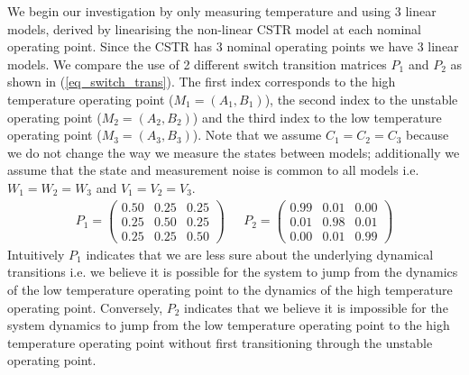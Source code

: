 We begin our investigation by only measuring temperature and using 3 linear models, derived by linearising the non-linear CSTR model at each nominal operating point. Since the CSTR has 3 nominal operating points we have 3 linear models. We compare the use of 2 different switch transition matrices $P_1$ and $P_2$ as shown in (\ref{eq_switch_trans}). The first index corresponds to the high temperature operating point ($M_1=(A_1, B_1)$), the second index to the unstable operating point ($M_2=(A_2, B_2)$) and the third index to the low temperature operating point ($M_3=(A_3, B_3)$). Note that we assume $C_1=C_2=C_3$ because we do not change the way we measure the states between models; additionally we assume that the state and measurement noise is common to all models i.e. $W_1=W_2=W_3$ and $V_1=V_2=V_3$.
\begin{equation}
\begin{aligned}
P_1 = \begin{pmatrix}
0.50 & 0.25 & 0.25 \\
0.25 & 0.50 & 0.25 \\
0.25 & 0.25 & 0.50
\end{pmatrix} 
~~~&P_2 = \begin{pmatrix}
0.99 & 0.01 & 0.00 \\
0.01 & 0.98 & 0.01 \\
0.00 & 0.01 & 0.99
\end{pmatrix}
\end{aligned}
\label{eq_switch_trans}
\end{equation}
Intuitively $P_1$ indicates that we are less sure about the underlying dynamical transitions i.e. we believe it is possible for the system to jump from the dynamics of the low temperature operating point to the dynamics of the high temperature operating point. Conversely, $P_2$ indicates that we believe it is impossible for the system dynamics to jump from the low temperature operating point to the high temperature operating point without first transitioning through the unstable operating point. 

